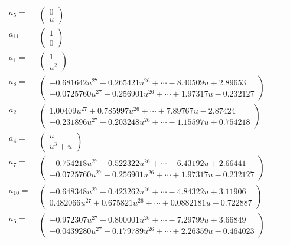 \documentclass[1p]{elsarticle_modified}
\theoremstyle{definition}
\begin{document}
\begin{tabular}{m{7pt} m{180pt} m{7pt} m{180pt} }
\flushright $a_{5}=$&$\begin{pmatrix}0\\u\end{pmatrix}$ \\
\flushright $a_{11}=$&$\begin{pmatrix}1\\0\end{pmatrix}$ \\
\flushright $a_{1}=$&$\begin{pmatrix}1\\u^2\end{pmatrix}$ \\
\flushright $a_{8}=$&$\begin{pmatrix}-0.681642 u^{27}-0.265421 u^{26}+\cdots-8.40509 u+2.89653\\-0.0725760 u^{27}-0.256901 u^{26}+\cdots+1.97317 u-0.232127\end{pmatrix}$ \\
\flushright $a_{2}=$&$\begin{pmatrix}1.00409 u^{27}+0.785997 u^{26}+\cdots+7.89767 u-2.87424\\-0.231896 u^{27}-0.203248 u^{26}+\cdots-1.15597 u+0.754218\end{pmatrix}$ \\
\flushright $a_{4}=$&$\begin{pmatrix}u\\u^3+u\end{pmatrix}$ \\
\flushright $a_{7}=$&$\begin{pmatrix}-0.754218 u^{27}-0.522322 u^{26}+\cdots-6.43192 u+2.66441\\-0.0725760 u^{27}-0.256901 u^{26}+\cdots+1.97317 u-0.232127\end{pmatrix}$ \\
\flushright $a_{10}=$&$\begin{pmatrix}-0.648348 u^{27}-0.423262 u^{26}+\cdots-4.84322 u+3.11906\\0.482066 u^{27}+0.675821 u^{26}+\cdots+0.0882181 u-0.722887\end{pmatrix}$ \\
\flushright $a_{6}=$&$\begin{pmatrix}-0.972307 u^{27}-0.800001 u^{26}+\cdots-7.29799 u+3.66849\\-0.0439280 u^{27}-0.179789 u^{26}+\cdots+2.26359 u-0.464023\end{pmatrix}$ \\

\end{tabular}
\end{document}
